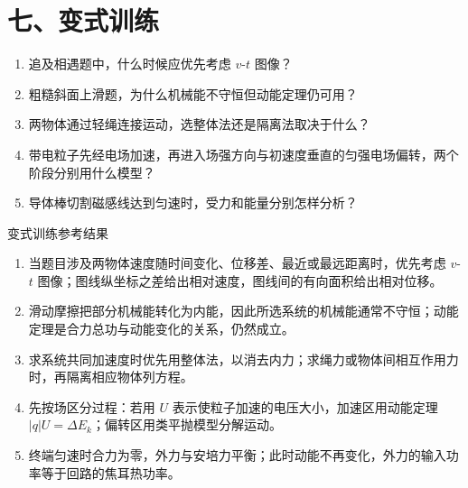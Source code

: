 \section*{七、变式训练}

\begin{enumerate}
  \item 追及相遇题中，什么时候应优先考虑 $v$-$t$ 图像？
  \item 粗糙斜面上滑题，为什么机械能不守恒但动能定理仍可用？
  \item 两物体通过轻绳连接运动，选整体法还是隔离法取决于什么？
  \begin{center}
  
  \end{center}
  \item 带电粒子先经电场加速，再进入场强方向与初速度垂直的匀强电场偏转，两个阶段分别用什么模型？
  \begin{center}
  
  \end{center}
  \item 导体棒切割磁感线达到匀速时，受力和能量分别怎样分析？
  \begin{center}
  
  \end{center}
\end{enumerate}

\begin{learningbox}{变式训练参考结果}
\begin{enumerate}[itemsep=0.45em,topsep=0.3em,parsep=0pt]
  \item 当题目涉及两物体速度随时间变化、位移差、最近或最远距离时，优先考虑 $v$-$t$ 图像；图线纵坐标之差给出相对速度，图线间的有向面积给出相对位移。
  \item 滑动摩擦把部分机械能转化为内能，因此所选系统的机械能通常不守恒；动能定理是合力总功与动能变化的关系，仍然成立。
  \item 求系统共同加速度时优先用整体法，以消去内力；求绳力或物体间相互作用力时，再隔离相应物体列方程。
  \item 先按场区分过程：若用 $U$ 表示使粒子加速的电压大小，加速区用动能定理 $|q|U=\Delta E_k$；偏转区用类平抛模型分解运动。
  \item 终端匀速时合力为零，外力与安培力平衡；此时动能不再变化，外力的输入功率等于回路的焦耳热功率。
\end{enumerate}
\end{learningbox}

